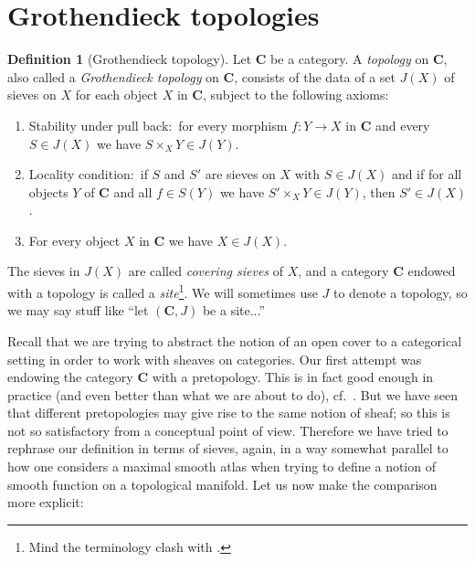 \documentclass[12pt,reqno,a4paper]{amsart}
\theoremstyle{plain}
\theoremstyle{definition}
\newtheorem{defn}[thm]{Definition}
\theoremstyle{remark}
\begin{document}
\section{Grothendieck topologies}

\begin{defn}[Grothendieck topology]
  Let $\mathbf{C}$ be a category.
  A \textit{topology} on $\mathbf{C}$, also called a \textit{Grothendieck topology} on $\mathbf{C}$, consists of the data of a set $J(X)$ of sieves on $X$ for each object $X$ in $\mathbf{C}$, subject to the following axioms:
  \begin{enumerate}[label=(T\arabic*)]
    \item Stability under pull back:~for every morphism $f \colon Y \to X$ in $\mathbf{C}$ and every $S \in J(X)$ we have $S \times_{X} Y \in J(Y)$.\label{t:1}
    \item Locality condition:~if $S$ and $S'$ are sieves on $X$ with $S \in J(X)$ and if for all objects $Y$ of $\mathbf{C}$ and all $f \in S(Y)$ we have $S' \times_{X} Y \in J(Y)$, then $S' \in J(X)$.\label{t:2}
    \item For every object $X$ in $\mathbf{C}$ we have $X \in J(X)$.\label{t:3}
  \end{enumerate}
  The sieves in $J(X)$ are called \textit{covering sieves} of $X$, and a category $\mathbf{C}$ endowed with a topology is called a \textit{site}\footnote{Mind the terminology clash with \cite{stacks-project}.}.
  We will sometimes use $J$ to denote a topology, so we may say stuff like ``let $(\mathbf{C},J)$ be a site...''
\end{defn}

Recall that we are trying to abstract the notion of an open cover to a categorical setting in order to work with sheaves on categories.
Our first attempt was endowing the category $\mathbf{C}$ with a pretopology.
This is in fact good enough in practice (and even better than what we are about to do), cf.~\cite[\href{https://stacks.math.columbia.edu/tag/00YW}{Tag 00YW}]{stacks-project}.
But we have seen that different pretopologies may give rise to the same notion of sheaf; so this is not so satisfactory from a conceptual point of view.
Therefore we have tried to rephrase our definition in terms of sieves, again, in a way somewhat parallel to how one considers a maximal smooth atlas when trying to define a notion of smooth function on a topological manifold.
Let us now make the comparison more explicit:
\end{document}
